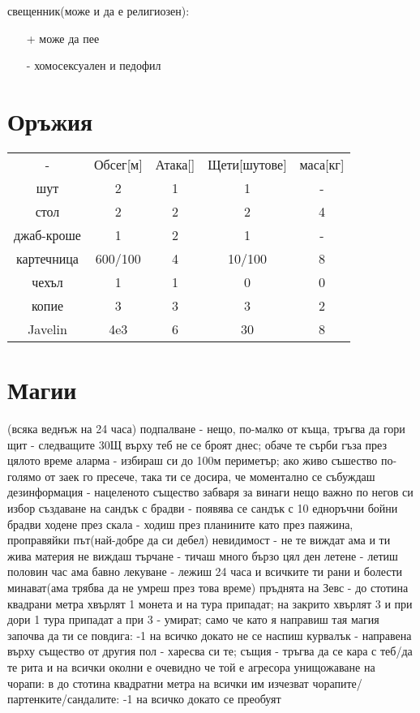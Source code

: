 \documentclass{article}
\begin{document}
свещенник(може и да е религиозен):
\begin{itemize}
\item[+] може да пее
\item[-] хомосексуален и педофил
\end{itemize}


\section{Оръжия}
\begin{tabular}{c | c| c | c | c}
- & Обсег[м] & Атака[]  & Щети[шутове] & маса[кг]  \\

шут & 2 & 1 & 1 & - \\
стол & 2 & 2 & 2 & 4  \\
джаб-кроше & 1 & 2 & 1 & - \\
картечница & 600/100 & 4 & 10/100 & 8\footnotemark  \\
чехъл & 1 & 1 & 0 & 0  \\
копие & 3 & 3 & 3 & 2  \\
Javelin & 4e3 & 6 & 30\footnotemark & 8 \\
\end{tabular}

\section{Магии}
(всяка веднъж на 24 часа)
подпалване - нещо, по-малко от къща, тръгва да гори
щит - следващите 30Щ върху теб не се броят днес; обаче те сърби гъза през цялото време
аларма - избираш си до 100м периметър; ако живо съшество по-голямо от заек го пресече, така ти се досира, че моментално се събуждаш
дезинформация - нацеленото същество забваря за винаги нещо важно по негов си избор
създаване на сандък с брадви - появява се сандък с 10 едноръчни бойни брадви
ходене през скала - ходиш през планините като през паяжина, проправяйки път(най-добре да си дебел)
невидимост - не те виждат ама и ти жива материя не виждаш
търчане - тичаш много бързо цял ден
летене - летиш половин час ама бавно
лекуване - лежиш 24 часа и всичките ти рани и болести минават(ама трябва да не умреш през това време)
пръднята на Зевс - до стотина квадрани метра хвърлят 1 монета и на тура припадат; на закрито хвърлят 3 и при дори 1 тура припадат а при 3 - умират; само че като я направиш тая магия започва да ти се повдига: -1 на всичко докато не се наспиш
курвалък - направена върху същество от другия пол - харесва си те; същия - тръгва да се кара с теб/да те рита и на всички околни е очевидно че той е агресора
унищожаване на чорапи: в до стотина квадратни метра на всички им изчезват чорапите/партенките/сандалите: -1 на всичко докато се преобуят
\end{document}
